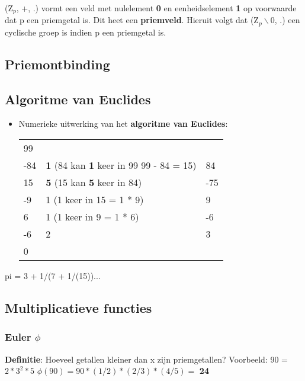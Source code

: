 \documentclass[12pt]{report}
\newcommand{\todo}[1] {
\color{red}\textunderscore{\textit{TODO: #1}}
\color{black}
}
\newcommand{\important}[1] {\textbf{\color{orange}#1}}
\begin{document}
(Z$_p$, +, .) vormt een veld met nulelement \important{0} en eenheidselement \important{1} op voorwaarde dat p een priemgetal is. Dit heet een
\important{priemveld}. Hieruit volgt dat (Z$_p\backslash$0, .) een cyclische groep is indien p een priemgetal is.


\subsection{Priemontbinding}
\todo{todo}



\subsection{Algoritme van Euclides}
\begin{itemize}
	\item Numerieke uitwerking van het \important{algoritme van Euclides}: \newline
	      	      
	      \begin{tabular}{l l l}
	      	99  &                            &     \\
	      	-84 & \important{1} (84 kan \important{1} keer in 99 99 - 84 = 15)  & 84  \\
	      	15  & \important{5} (15 kan \important{5} keer in 84) & -75 \\
	      	-9  & 1  (1 keer in 15 = 1 * 9)  & 9   \\
	      	6   & 1   (1 keer in 9 = 1 * 6)  & -6  \\
	      	-6  & 2                          & 3   \\
	      	0   &                            &     
	      \end{tabular}
	      	      
	      	      
\end{itemize}


 pi = 3 + 1/(7 + 1/(15))...
 
\subsection{Multiplicatieve functies}
\subsubsection{Euler $\phi$} 
\important{Definitie}: Hoeveel getallen kleiner dan x zijn priemgetallen?
\newline
Voorbeeld: 90 = $2 * 3^2 * 5$
\newline $\phi(90) = 90 * (1/2) * (2/3) * (4/5) = $ \important{24}
\end{document}
